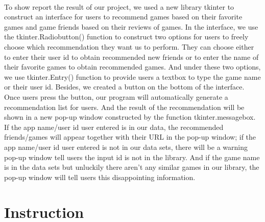 \documentclass[fontsize=11pt]{article}
\begin{document}
    \\To show report the result of our project, we used a new library tkinter to construct an interface for users to recommend games based on their favorite games and game friends based on their reviews of games. In the interface, we use the tkinter.Radiobutton() function to construct two options for users to freely choose which recommendation they want us to perform. They can choose either to enter their user id to obtain recommended new friends or to enter the name of their favorite games to obtain recommended games. And under these two options, we use tkinter.Entry() function to provide users a textbox to type the game name or their user id. Besides, we created a button on the bottom of the interface. Once users press the button, our program will automatically generate a recommendation list for users. And the result of the recommendation will be shown in a new pop-up window constructed by the function tkinter.messagebox. If the app name/user id user entered is in our data, the recommended friends/games will appear together with their URL in the pop-up window; if the app name/user id user entered is not in our data sets, there will be a warning pop-up window tell users the input id is not in the library. And if the game name is in the data sets but unluckily there aren’t any similar games in our library, the pop-up window will tell users this disappointing information.


    \section*{Instruction}
    
\end{document}
